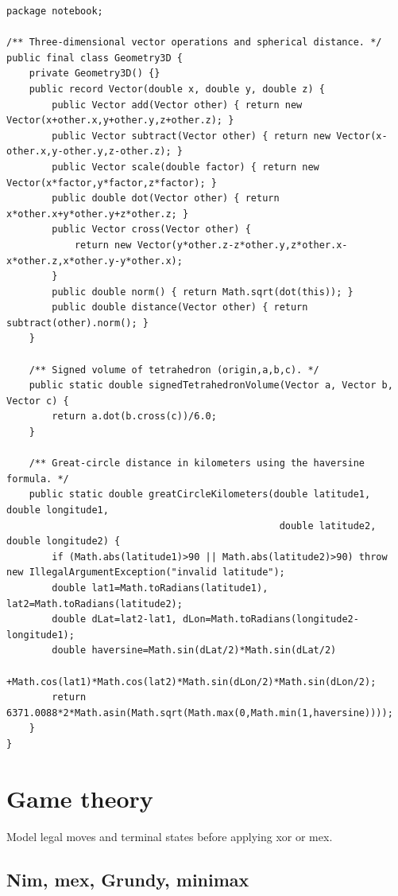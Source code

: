 \documentclass[10pt,letterpaper]{article}
\begin{document}
\begin{lstlisting}
package notebook;

/** Three-dimensional vector operations and spherical distance. */
public final class Geometry3D {
    private Geometry3D() {}
    public record Vector(double x, double y, double z) {
        public Vector add(Vector other) { return new Vector(x+other.x,y+other.y,z+other.z); }
        public Vector subtract(Vector other) { return new Vector(x-other.x,y-other.y,z-other.z); }
        public Vector scale(double factor) { return new Vector(x*factor,y*factor,z*factor); }
        public double dot(Vector other) { return x*other.x+y*other.y+z*other.z; }
        public Vector cross(Vector other) {
            return new Vector(y*other.z-z*other.y,z*other.x-x*other.z,x*other.y-y*other.x);
        }
        public double norm() { return Math.sqrt(dot(this)); }
        public double distance(Vector other) { return subtract(other).norm(); }
    }

    /** Signed volume of tetrahedron (origin,a,b,c). */
    public static double signedTetrahedronVolume(Vector a, Vector b, Vector c) {
        return a.dot(b.cross(c))/6.0;
    }

    /** Great-circle distance in kilometers using the haversine formula. */
    public static double greatCircleKilometers(double latitude1, double longitude1,
                                                double latitude2, double longitude2) {
        if (Math.abs(latitude1)>90 || Math.abs(latitude2)>90) throw new IllegalArgumentException("invalid latitude");
        double lat1=Math.toRadians(latitude1), lat2=Math.toRadians(latitude2);
        double dLat=lat2-lat1, dLon=Math.toRadians(longitude2-longitude1);
        double haversine=Math.sin(dLat/2)*Math.sin(dLat/2)
                +Math.cos(lat1)*Math.cos(lat2)*Math.sin(dLon/2)*Math.sin(dLon/2);
        return 6371.0088*2*Math.asin(Math.sqrt(Math.max(0,Math.min(1,haversine))));
    }
}
\end{lstlisting}
\section{Game theory}
\begin{guidebox}Model legal moves and terminal states before applying xor or mex.\end{guidebox}
\subsection{Nim, mex, Grundy, minimax}
\end{document}
